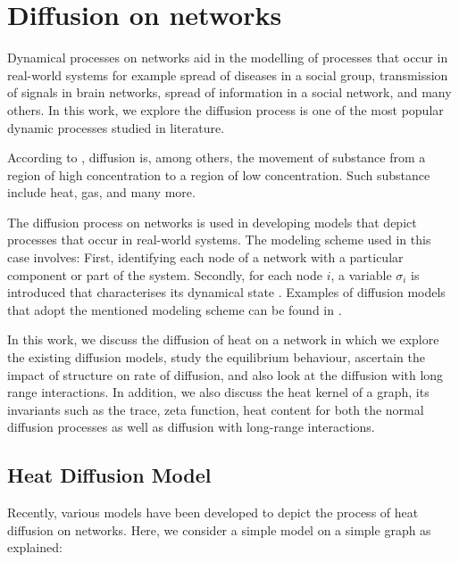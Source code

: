 \documentclass[10pt,a4paper]{article}
\begin{document}
    \newpage
    \section{Diffusion on networks}
    Dynamical processes on networks aid in the modelling of processes that occur in real-world systems for example spread of diseases in a social group, transmission of signals in brain networks, spread of information in a social network, and many others. In this work, we explore the diffusion process is one of the most popular dynamic processes studied in literature.
    
    According to \citep{newman2010networks}, diffusion is, among others, the movement of substance from a region of high concentration to a region of low concentration. Such substance include heat, gas, and many more. 
    
    The diffusion process on networks is used in developing models that depict processes that occur in real-world systems. The modeling scheme used in this case involves: First, identifying each node of a network with a particular component or part of the system. Secondly, for each node $i$, a variable $\sigma_i$ is introduced that characterises its dynamical state \citep{barrat2008dynamical}. Examples of diffusion models that adopt the mentioned modeling scheme can be found in \citep{estrada2011epidemic,kasprzak2012diffusion,lopez2008diffusion}. 
    
    In this work, we discuss the diffusion of heat on a network in which we explore the existing diffusion models, study the equilibrium behaviour, ascertain the impact of structure on rate of diffusion, and also look at the diffusion with long range interactions. In addition, we also discuss the heat kernel of a graph, its invariants such as the trace, zeta function, heat content for both the normal diffusion processes as well as diffusion with long-range interactions.
    
    \subsection{Heat Diffusion Model}
    Recently, various models have been developed to depict the process of heat diffusion on networks. Here, we consider a simple model on a simple graph as explained:
    
    
\end{document}
